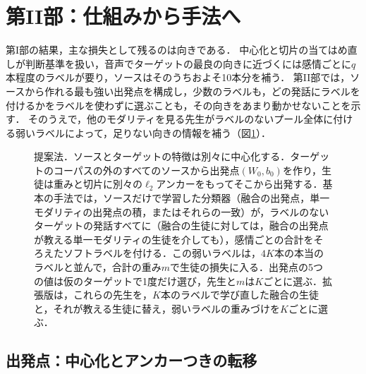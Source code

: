 \section{第II部：仕組みから手法へ}
\label{sec:part2-mechanism-to-method}

第I部の結果，主な損失として残るのは向きである．
中心化と切片の当てはめ直しが判断基準を扱い，音声でターゲットの最良の向きに近づくには感情ごとに$q$本程度のラベルが要り，ソースはそのうちおよそ10本分を補う．
第II部では，ソースから作れる最も強い出発点を構成し，少数のラベルも，どの発話にラベルを付けるかをラベルを使わずに選ぶことも，その向きをあまり動かせないことを示す．
そのうえで，他のモダリティを見る先生がラベルのないプール全体に付ける弱いラベルによって，足りない向きの情報を補う（図\ref{fig:method}）．

\begin{figure}[t]
\centering
{}
\caption{提案法．ソースとターゲットの特徴は別々に中心化する．ターゲットのコーパスの外のすべてのソースから出発点$(W_0, b_0)$を作り，生徒は重みと切片に別々の$\ell_2$アンカーをもってそこから出発する．基本の手法では，ソースだけで学習した分類器（融合の出発点，単一モダリティの出発点の積，またはそれらの一致）が，ラベルのないターゲットの発話すべてに（融合の生徒に対しては，融合の出発点が教える単一モダリティの生徒を介しても），感情ごとの合計をそろえたソフトラベルを付ける．この弱いラベルは，$4K$本の本当のラベルと並んで，合計の重み$m$で生徒の損失に入る．出発点の5つの値は仮のターゲットで1度だけ選び，先生と$m$は$K$ごとに選ぶ．拡張版は，これらの先生を，$K$本のラベルで学び直した融合の生徒と，それが教える生徒に替え，弱いラベルの重みづけを$K$ごとに選ぶ．}
\label{fig:method}
\end{figure}

\subsection{出発点：中心化とアンカーつきの転移}
\label{sec:part2-start}

